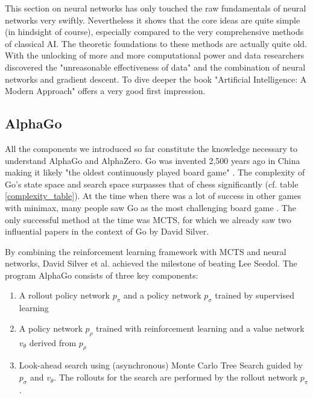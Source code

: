 This section on neural networks has only touched the raw fundamentals of neural networks very swiftly. Nevertheless it shows that the core ideas are quite simple (in hindsight of course), especially compared to the very comprehensive methods of classical AI. The theoretic foundations to these methods are actually quite old. With the unlocking of more and more computational power and data researchers discovered the "unreasonable effectiveness of data" \cite{halevy_unreasonable_2009} and the combination of neural networks and gradient descent. To dive deeper the book "Artificial Intelligence: A Modern Approach" \cite{russell_artificial_2021} offers a very good first impression.

\subsection{AlphaGo}
All the components we introduced so far constitute the knowledge necessary to understand AlphaGo and AlphaZero. Go was invented 2,500 years ago in China making it likely "the oldest continuously played board game" \cite{noauthor_go_2022}. The complexity of Go's state space and search space surpasses that of chess significantly (cf. table \ref{complexity_table}). At the time when there was a lot of success in other games with minimax, many people saw Go as the most challenging board game \cite{muller_computer_2002}. The only successful method at the time was MCTS, for which we already saw two influential papers in the context of Go by David Silver.

By combining the reinforcement learning framework with MCTS and neural networks, David Silver et al. achieved the milestone of beating Lee Seedol. The program AlphaGo consists of three key components:

\begin{enumerate}
    \item A rollout policy network $p_{\pi}$ and a policy network $p_{\sigma}$ trained by supervised learning
    \item A policy network $p_{\rho}$ trained with reinforcement learning and a value network $v_{\theta}$ derived from $p_{\rho}$
    \item Look-ahead search using (asynchronous) Monte Carlo Tree Search guided by $p_{\sigma}$ and $v_{\theta}$. The rollouts for the search are performed by the rollout network $p_{\pi}$.
\end{enumerate}


